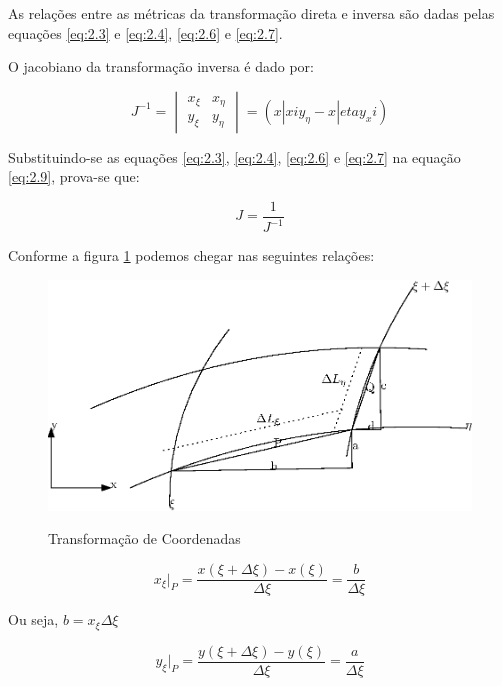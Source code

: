 As relações entre as métricas da transformação direta e inversa são dadas pelas equações \ref{eq:2.3} e \ref{eq:2.4}, \ref{eq:2.6} e \ref{eq:2.7}.

O jacobiano da transformação inversa é dado por:

\begin{equation}
    \label{eq:2.9}
    J^{-1} =
    \begin{vmatrix}
        x_\xi & x_\eta\\
        y_\xi & y_\eta
    \end{vmatrix}
    = (x|xi y_\eta - x|eta y_xi)
\end{equation}

Substituindo-se as equações \ref{eq:2.3}, \ref{eq:2.4}, \ref{eq:2.6} e \ref{eq:2.7} na equação \ref{eq:2.9}, prova-se que:

\begin{equation}
    \label{eq:2.10}
    J = \frac{1}{J^{-1}}
\end{equation}

Conforme a figura \ref{fig:transformacao} podemos chegar nas seguintes relações:
\begin{figure}[]
    \centering
    \includegraphics{fig/transformacao.eps}
    \label{fig:transformacao}
    \caption{Transformação de Coordenadas}
\end{figure}

\begin{equation*}
    x_\xi \vert_P = \frac{x(\xi+\Delta \xi)-x(\xi)}{\Delta \xi} = \frac{b}{\Delta \xi}
\end{equation*}

Ou seja, $b=x_\xi \Delta \xi$

\begin{equation*}
    y_\xi \vert_P = \frac{y(\xi+\Delta \xi)-y(\xi)}{\Delta \xi} = \frac{a}{\Delta \xi}    
\end{equation*}


